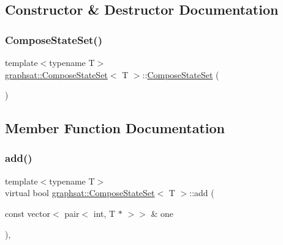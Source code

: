 \subsection{Constructor \& Destructor Documentation}
\mbox{\label{classgraphsat_1_1_compose_state_set_aef6ac032dff8b476edd7c7cb6c4bd164}} 
\subsubsection{\texorpdfstring{ComposeStateSet()}{ComposeStateSet()}}
{\footnotesize\ttfamily template$<$typename T$>$ \\
\mbox{\hyperlink{classgraphsat_1_1_compose_state_set}{graphsat\+::\+Compose\+State\+Set}}$<$ T $>$\+::\mbox{\hyperlink{classgraphsat_1_1_compose_state_set}{Compose\+State\+Set}} (\begin{DoxyParamCaption}{ }\end{DoxyParamCaption})\hspace{0.3cm}{\ttfamily [inline]}}



\subsection{Member Function Documentation}
\mbox{\label{classgraphsat_1_1_compose_state_set_a0f359257087c8ae10bf25881f9448395}} 
\subsubsection{\texorpdfstring{add()}{add()}}
{\footnotesize\ttfamily template$<$typename T$>$ \\
virtual bool \mbox{\hyperlink{classgraphsat_1_1_compose_state_set}{graphsat\+::\+Compose\+State\+Set}}$<$ T $>$\+::add (\begin{DoxyParamCaption}\item[{const vector$<$ pair$<$ int, T $\ast$ $>$$>$ \&}]{one }\end{DoxyParamCaption})\hspace{0.3cm}{\ttfamily [inline]}, {\ttfamily [virtual]}}



